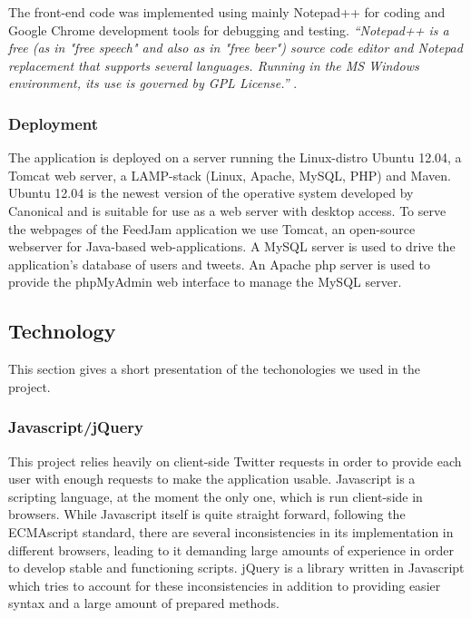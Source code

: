 The front-end code was implemented using mainly Notepad++ for coding and Google Chrome development tools for debugging and testing. \textit{``Notepad++ is a free (as in "free speech" and also as in "free beer") source code editor and Notepad replacement that supports several languages. Running in the MS Windows environment, its use is governed by GPL License.''} \cite{Ho2012}.

\subsubsection{Deployment}
The application is deployed on a server running the Linux-distro Ubuntu 12.04, a Tomcat web server, a LAMP-stack (Linux, Apache, MySQL, PHP) and Maven. Ubuntu 12.04 is the newest version of the operative system developed by Canonical and is suitable for use as a web server with desktop access. To serve the webpages of the FeedJam application we use Tomcat, an open-source webserver for Java-based web-applications. A MySQL server is used to drive the application's database of users and tweets. An Apache php server is used to provide the phpMyAdmin web interface to manage the MySQL server.


\subsection{Technology}
This section gives a short presentation of the techonologies we used in the project. 

\subsubsection{Javascript/jQuery} %
This project relies heavily on client-side Twitter requests in order to provide each user with enough requests to make the application usable. Javascript is a scripting language, at the moment the only one, which is run client-side in browsers. While Javascript itself is quite straight forward, following the ECMAscript standard, there are several inconsistencies in its implementation in different browsers, leading to it demanding large amounts of experience in order to develop stable and functioning scripts. jQuery is a library written in Javascript which tries to account for these inconsistencies in addition to providing easier syntax and a large amount of prepared methods.

